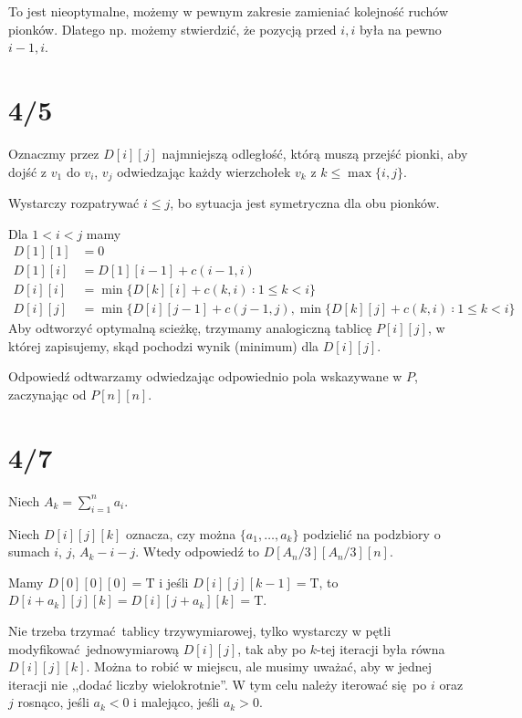 \documentclass[a4paper, 12pt]{article}
\title{}
\author{Wiktor Kuchta}
\date{\vspace{-4ex}}
\newcommand{\+}{\enspace}
\begin{document}
\maketitle

\iffalse

To jest nieoptymalne, możemy w pewnym zakresie zamieniać kolejność ruchów pionków.
Dlatego np. możemy stwierdzić, że pozycją przed $i,i$ była na pewno $i-1,i$.

\section*{4/5}

Oznaczmy przez $D[i][j]$ najmniejszą odległość, którą muszą przejść
pionki, aby dojść z $v_1$ do $v_i$, $v_j$ odwiedzając każdy wierzchołek
$v_k$ z $k ≤ \max \{ i, j \}$.

Wystarczy rozpatrywać $i ≤ j$, bo sytuacja jest symetryczna dla obu pionków.

Dla $1 < i < j$ mamy
\begin{align*}
	D[1][1] &= 0 \\
	D[1][i] &= D[1][i-1] + c(i-1, i) \\
	D[i][i] &= \min \{ D[k][i] + c(k,i) ∶ 1 ≤ k < i \} \\
	D[i][j] &= \min \{ D[i][j-1] + c(j-1, j), \min \{ D[k][j] + c(k,i) ∶ 1 ≤ k < i \}
\end{align*}
Aby odtworzyć optymalną scieżkę, trzymamy analogiczną tablicę $P[i][j]$,
w której zapisujemy, skąd pochodzi wynik (minimum) dla $D[i][j]$.

Odpowiedź odtwarzamy odwiedzając odpowiednio pola wskazywane w $P$, zaczynając
od $P[n][n]$.

\section*{4/7}
Niech $A_k = ∑_{i=1}^n a_i$.

Niech $D[i][j][k]$ oznacza, czy można $\{ a_1, …, a_k \}$
podzielić na podzbiory o sumach $i$, $j$, $A_k-i-j$.
Wtedy odpowiedź to $D[A_n/3][A_n/3][n]$.

Mamy $D[0][0][0] = \text{T}$ i jeśli
$D[i][j][k-1] = \text{T}$, to $D[i+a_k][j][k] = D[i][j+a_k][k] = \text{T}$.

Nie trzeba trzymać tablicy trzywymiarowej, tylko
wystarczy w pętli modyfikować jednowymiarową $D[i][j]$, tak
aby po $k$-tej iteracji była równa $D[i][j][k]$.
Można to robić w miejscu, ale musimy uważać, aby
w jednej iteracji nie ,,dodać liczby wielokrotnie''.
W tym celu należy iterować się po $i$ oraz $j$
rosnąco, jeśli $a_k < 0$ i malejąco, jeśli $a_k > 0$.
\end{document}
